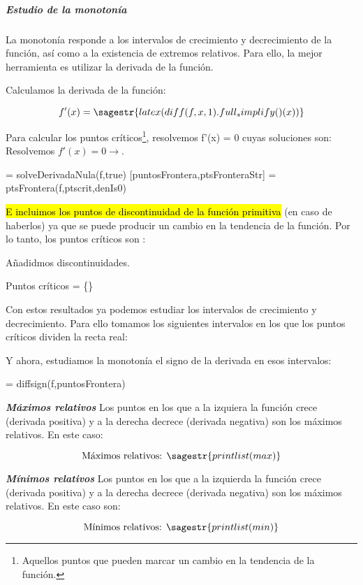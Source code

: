 
\subparagraph{Estudio de la monotonía}


\ifverbose
La monotonía responde a los intervalos de crecimiento y decrecimiento de la función, así como a la existencia de extremos relativos.
%
Para ello, la mejor herramienta es utilizar la derivada de la función.

Calculamos la derivada de la función:
\fi

\[f'(x) = \sagestr{latex(diff(f,x,1).full_simplify()(x))} \]

\ifverbose
    Para calcular los puntos críticos\footnote{Aquellos puntos que pueden marcar un cambio en la tendencia de la función.}, resolvemos f'(x) = 0 cuyas soluciones son:
    \\

\else
    Resolvemos $f'(x) = 0\rightarrow $. 
\fi
\begin{sagesilent}
 = solveDerivadaNula(f,true)
[puntosFrontera,ptsFronteraStr] = ptsFrontera(f,ptscrit,denIs0)
\end{sagesilent}

\ifverbose
\hl{E incluimos los puntos de discontinuidad de la función primitiva} (en caso de haberlos) ya que se puede producir un cambio en la tendencia de la función. 
%
Por lo tanto, los puntos críticos son : 

\else
Añadidmos discontinuidades. 

Puntos críticos = \{\}
\fi



\ifverbose
Con estos resultados ya podemos estudiar los intervalos de crecimiento y decrecimiento. 
%
Para ello tomamos los siguientes intervalos en los que los puntos críticos dividen la recta real:
\fi


\ifverbose
Y ahora, estudiamos la monotonía el signo de la derivada en esos intervalos:
\fi
\begin{sagesilent}
 = diffsign(f,puntosFrontera)

\end{sagesilent}


\textbf{\textit{Máximos relativos}}
\ifverbose
Los puntos en los que a la izquiera la función crece (derivada positiva) y a la derecha decrece (derivada negativa) son los máximos relativos. En este caso: 
\fi

\[\text{Máximos relativos: } \sagestr{printlist(max)}\]

\textbf{\textit{Mínimos relativos}}
\ifverbose
Los puntos en los que a la izquierda la función crece (derivada positiva) y a la derecha decrece (derivada negativa) son los máximos relativos. En este caso son: 
\fi

\[\text{Mínimos relativos: }\sagestr{printlist(min)}\]


